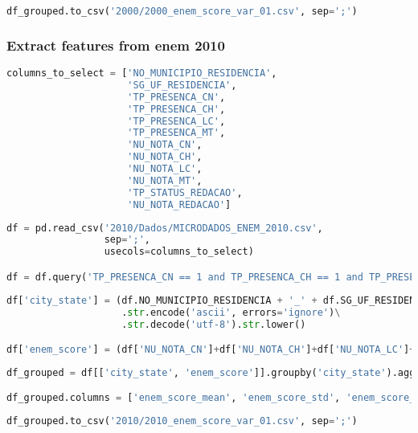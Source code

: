 \begin{lstlisting}[language=Python]
df_grouped.to_csv('2000/2000_enem_score_var_01.csv', sep=';')
\end{lstlisting}

\hypertarget{extract-features-from-enem-2010}{%
\subsubsection{Extract features from enem
2010}\label{extract-features-from-enem-2010}}

\begin{lstlisting}[language=Python]
columns_to_select = ['NO_MUNICIPIO_RESIDENCIA',
                     'SG_UF_RESIDENCIA',
                     'TP_PRESENCA_CN',
                     'TP_PRESENCA_CH',
                     'TP_PRESENCA_LC',
                     'TP_PRESENCA_MT',
                     'NU_NOTA_CN',
                     'NU_NOTA_CH',
                     'NU_NOTA_LC',
                     'NU_NOTA_MT',
                     'TP_STATUS_REDACAO',
                     'NU_NOTA_REDACAO']
\end{lstlisting}

\begin{lstlisting}[language=Python]
df = pd.read_csv('2010/Dados/MICRODADOS_ENEM_2010.csv',
                 sep=';',
                 usecols=columns_to_select)

df = df.query('TP_PRESENCA_CN == 1 and TP_PRESENCA_CH == 1 and TP_PRESENCA_LC == 1 and TP_PRESENCA_MT == 1 and TP_STATUS_REDACAO == "P"')
\end{lstlisting}

\begin{lstlisting}[language=Python]
df['city_state'] = (df.NO_MUNICIPIO_RESIDENCIA + '_' + df.SG_UF_RESIDENCIA).str.normalize('NFKD')\
                    .str.encode('ascii', errors='ignore')\
                    .str.decode('utf-8').str.lower()

df['enem_score'] = (df['NU_NOTA_CN']+df['NU_NOTA_CH']+df['NU_NOTA_LC']+df['NU_NOTA_MT']+df['NU_NOTA_REDACAO'])/5
\end{lstlisting}

\begin{lstlisting}[language=Python]
df_grouped = df[['city_state', 'enem_score']].groupby('city_state').agg(['mean', 'std', 'median'])

df_grouped.columns = ['enem_score_mean', 'enem_score_std', 'enem_score_median']
\end{lstlisting}

\begin{lstlisting}[language=Python]
df_grouped.to_csv('2010/2010_enem_score_var_01.csv', sep=';')
\end{lstlisting}

